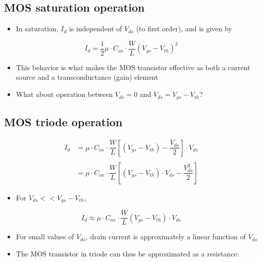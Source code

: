 \documentclass[11pt]{article}
\providecommand{\tightlist}{%
      \setlength{\itemsep}{0pt}\setlength{\parskip}{0pt}}
\begin{document}
    \hypertarget{mos-saturation-operation}{%
\subsection{MOS saturation operation}\label{mos-saturation-operation}}

    

    \begin{itemize}
\tightlist
\item
  In saturation, \(I_{d}\) is independent of \(V_{ds}\) (to first
  order), and is given by
\end{itemize}

\begin{equation}
I_d = \dfrac{1}{2}\mu\cdot C_{ox} \cdot \dfrac{W}{L}(V_{gs}-V_{th})^2
\end{equation}

\begin{itemize}
\tightlist
\item
  This behavior is what makes the MOS transistor effective as both a
  current source and a transconductance (gain) element
\item
  What about operation between \(V_{ds}=0\) and
  \(V_{ds}=V_{gs}-V_{th}\)?
\end{itemize}

    \hypertarget{mos-triode-operation}{%
\subsection{MOS triode operation}\label{mos-triode-operation}}

    \begin{align}
I_d &= \mu \cdot C_{ox} \cdot \dfrac{W}{L} {\left[(V_{gs} - V_{th}) - \dfrac{V_{ds}}{2}\right]\cdot V_{ds}}\\
\\
&= \mu \cdot C_{ox} \cdot \dfrac{W}{L} {\left[(V_{gs} - V_{th})\cdot V_{ds} - \dfrac{V_{ds}^2}{2}\right]}
\end{align}

\begin{itemize}
\tightlist
\item
  For \(V_{ds} << V_{gs} - V_{th}\),
\end{itemize}

\begin{equation}
I_d \approx \mu \cdot C_{ox} \cdot \dfrac{W}{L} {(V_{gs} - V_{th})\cdot V_{ds}}
\end{equation}

    \begin{itemize}
\tightlist
\item
  For small values of \(V_{ds}\), drain current is approximately a
  linear function of \(V_{ds}\)
\item
  The MOS transistor in triode can thus be approximated as a resistance:
\end{itemize}
\end{document}
